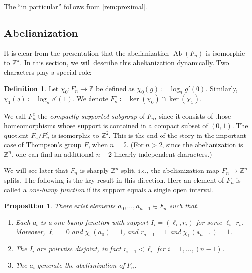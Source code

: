\documentclass[reqno,12pt]{amsart}\setcounter{tocdepth}{1}
\newtheorem{proposition}[theorem]{Proposition}
\theoremstyle{definition}
\newtheorem{definition}[theorem]{Definition}
\newcommand{\Z}{\mathbb{Z}}
\DeclareMathOperator{\Ab}{Ab}
\numberwithin{equation}{section}
\begin{document}
The ``in particular'' follows from \cref{rem:proximal}.


\subsection{Abelianization}

It is clear from the presentation that the abelianization $\Ab(F_n)$ is isomorphic to $\Z^n$. In this section, we will describe this abelianization dynamically. Two characters play a special role:

\begin{definition}
\label{def:chi01}
    Let $\chi_0 \colon F_n \to \Z$ be 	defined as $\chi_0(g) \coloneqq \log_n g'(0)$. Similarly, $\chi_1(g) \coloneqq \log_n g'(1)$. We denote $F_n^c \coloneqq \ker(\chi_0) \cap \ker(\chi_1)$.
\end{definition}

We call $F_n^c$ the \emph{compactly supported subgroup} of $F_n$, since it consists of those homeomorphisms whose support is contained in a compact subset of $(0, 1)$. The quotient $F_n / F_n^c$ is isomorphic to $\Z^2$. This is the end of the story in the important case of Thompson's group $F$, when $n  = 2$. (For $n > 2$, since the abelianization is $\Z^n$, one can find an additional $n-2$ linearly independent characters.)

We will see later that $F_n$ is sharply $\Z^n$-split, i.e., the abelianization map $F_n\to\Z^n$ splits. The following is the key result in this direction. Here an element of $F_n$ is called a \emph{one-bump function} if its support equals a single open interval.

\begin{proposition}\label{prop:modelsplitting}
There exist elements $a_0, \ldots, a_{n-1} \in F_n$ such that:
\begin{enumerate}
\item Each $a_i$ is a one-bump function with support $I_i = (\ell_i, r_i)$ for some $\ell_i,r_i$. Moreover, $\ell_0 = 0$ and $\chi_0(a_0)=1$, and $r_{n-1} = 1$ and $\chi_1(a_{n-1})=1$.
\item The $I_i$ are pairwise disjoint, in fact $r_{i-1} < \ell_i$ for $i = 1, \ldots, (n-1)$.
\item The $a_i$ generate the abelianization of $F_n$.
\end{enumerate}
\end{proposition}
\end{document}
